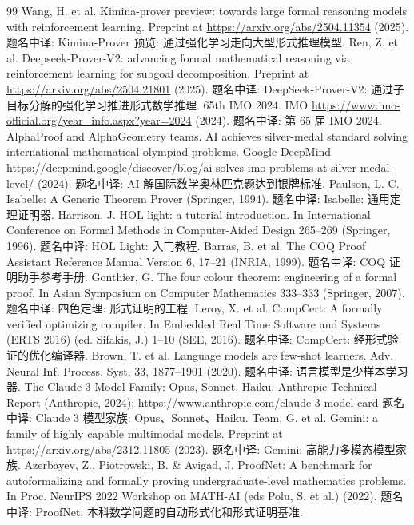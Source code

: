\begin{thebibliography}{99}
 Wang, H. et al. Kimina-prover preview: towards large formal reasoning models with reinforcement learning. Preprint at \url{https://arxiv.org/abs/2504.11354} (2025). 题名中译: Kimina-Prover 预览: 通过强化学习走向大型形式推理模型.
 Ren, Z. et al. Deepseek-Prover-V2: advancing formal mathematical reasoning via reinforcement learning for subgoal decomposition. Preprint at \url{https://arxiv.org/abs/2504.21801} (2025). 题名中译: DeepSeek-Prover-V2: 通过子目标分解的强化学习推进形式数学推理.
 65th IMO 2024. IMO \url{https://www.imo-official.org/year_info.aspx?year=2024} (2024). 题名中译: 第 65 届 IMO 2024.
 AlphaProof and AlphaGeometry teams. AI achieves silver-medal standard solving international mathematical olympiad problems. Google DeepMind \url{https://deepmind.google/discover/blog/ai-solves-imo-problems-at-silver-medal-level/} (2024). 题名中译: AI 解国际数学奥林匹克题达到银牌标准.
 Paulson, L. C. Isabelle: A Generic Theorem Prover (Springer, 1994). 题名中译: Isabelle: 通用定理证明器.
 Harrison, J. HOL light: a tutorial introduction. In International Conference on Formal Methods in Computer-Aided Design 265--269 (Springer, 1996). 题名中译: HOL Light: 入门教程.
 Barras, B. et al. The COQ Proof Assistant Reference Manual Version 6, 17--21 (INRIA, 1999). 题名中译: COQ 证明助手参考手册.
 Gonthier, G. The four colour theorem: engineering of a formal proof. In Asian Symposium on Computer Mathematics 333--333 (Springer, 2007). 题名中译: 四色定理: 形式证明的工程.
 Leroy, X. et al. CompCert: A formally verified optimizing compiler. In Embedded Real Time Software and Systems (ERTS 2016) (ed. Sifakis, J.) 1--10 (SEE, 2016). 题名中译: CompCert: 经形式验证的优化编译器.
 Brown, T. et al. Language models are few-shot learners. Adv. Neural Inf. Process. Syst. 33, 1877--1901 (2020). 题名中译: 语言模型是少样本学习器.
 The Claude 3 Model Family: Opus, Sonnet, Haiku, Anthropic Technical Report (Anthropic, 2024); \url{https://www.anthropic.com/claude-3-model-card} 题名中译: Claude 3 模型家族: Opus、Sonnet、Haiku.
 Team, G. et al. Gemini: a family of highly capable multimodal models. Preprint at \url{https://arxiv.org/abs/2312.11805} (2023). 题名中译: Gemini: 高能力多模态模型家族.
 Azerbayev, Z., Piotrowski, B. \& Avigad, J. ProofNet: A benchmark for autoformalizing and formally proving undergraduate-level mathematics problems. In Proc. NeurIPS 2022 Workshop on MATH-AI (eds Polu, S. et al.) (2022). 题名中译: ProofNet: 本科数学问题的自动形式化和形式证明基准.

\end{thebibliography}
